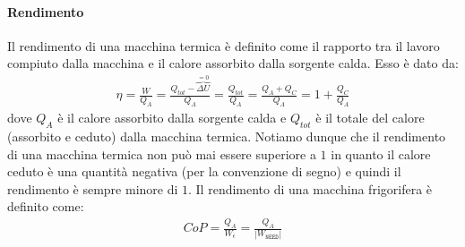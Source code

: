     \paragraph{Rendimento}
        Il rendimento di una macchina termica è definito come il rapporto tra il lavoro compiuto dalla macchina e il calore assorbito dalla sorgente calda. Esso è dato da:
        \begin{align}
            \eta = \frac{W}{Q_A} = \frac{Q_{tot} - \overbrace{\Delta U}^{=0}}{Q_A} = \frac{Q_{tot}}{Q_A} = \frac{Q_A+Q_C}{Q_A} = 1 + \frac{Q_C}{Q_A}
        \end{align}
        dove $Q_A$ è il calore assorbito dalla sorgente calda e $Q_{tot}$ è il totale del calore (assorbito e ceduto) dalla macchina termica. Notiamo dunque che il rendimento di una macchina termica non può mai essere superiore a $1$ in quanto il calore ceduto è una quantità negativa (per la convenzione di segno) e quindi il rendimento è sempre minore di $1$. \newline
        Il rendimento di una macchina frigorifera è definito come:
        \begin{align}
            CoP = \frac{Q_A}{W_\epsilon} = \frac{Q_A}{|W_{\texttt{NEED}}|}
        \end{align}
    \newpage
